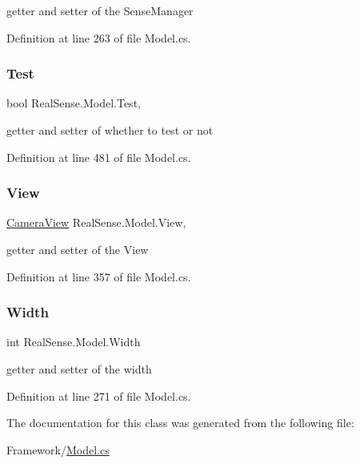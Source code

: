 getter and setter of the Sense\+Manager 

Definition at line 263 of file Model.\+cs.

\mbox{\label{class_real_sense_1_1_model_a89f4614b0f880fb6553ebcea3d2e6a6c}} 
\subsubsection{\texorpdfstring{Test}{Test}}
{\footnotesize\ttfamily bool Real\+Sense.\+Model.\+Test\hspace{0.3cm}{\ttfamily [get]}, {\ttfamily [set]}}

getter and setter of whether to test or not 

Definition at line 481 of file Model.\+cs.

\mbox{\label{class_real_sense_1_1_model_ad06548f5b1e3b3bfeaca2635d2b24fc6}} 
\subsubsection{\texorpdfstring{View}{View}}
{\footnotesize\ttfamily \hyperlink{class_real_sense_1_1_camera_view}{Camera\+View} Real\+Sense.\+Model.\+View\hspace{0.3cm}{\ttfamily [get]}, {\ttfamily [set]}}

getter and setter of the View 

Definition at line 357 of file Model.\+cs.

\mbox{\label{class_real_sense_1_1_model_a20e2b5bc79da762b436b75ddd28f63b7}} 
\subsubsection{\texorpdfstring{Width}{Width}}
{\footnotesize\ttfamily int Real\+Sense.\+Model.\+Width\hspace{0.3cm}{\ttfamily [get]}}

getter and setter of the width 

Definition at line 271 of file Model.\+cs.



The documentation for this class was generated from the following file\+:\begin{DoxyCompactItemize}
\item 
Framework/\hyperlink{_model_8cs}{Model.\+cs}\end{DoxyCompactItemize}
